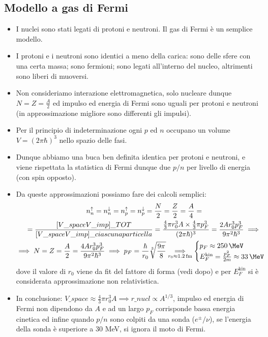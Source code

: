 \subsection{Modello a gas di Fermi}
\begin{itemize}
    \item I nuclei sono stati legati di protoni e neutroni. Il gas di Fermi è un semplice modello.
    \item I protoni e i neutroni sono identici a meno della carica: sono delle sfere con una certa massa; sono fermioni; sono legati all'interno del nucleo, altrimenti sono liberi di muoversi. 
    \item Non consideriamo interazione elettromagnetica, solo nucleare dunque $N=Z=\frac A2$ ed impulso ed energia di Fermi sono uguali per protoni e neutroni (in approssimazione migliore sono differenti gli impulsi). 
    \item Per il principio di indeterminazione ogni $p$ ed $n$ occupano un volume $V=(2\pi\hbar)^3$ nello spazio delle fasi.
    \item Dunque abbiamo una buca ben definita identica per protoni e neutroni, e viene rispettata la statistica di Fermi dunque due $p/n$ per livello di energia (con spin opposto).
    \item Da queste approssimazioni possiamo fare dei calcoli semplici:
    \begin{gather*}
    n_n^\uparrow=n_n^\downarrow=n_p^\uparrow=n_p^\downarrow=\frac N2=\frac Z2=\frac A4=\\
    =\frac{[V\_{space}V\_{imp}]\_{TOT}}{[V\_{space}V\_{imp}]\_{ciascuna particella}}=\frac{\frac43\pi r_0^3A\times\frac43\pi p_F^3}{(2\pi\hbar)^3}=\frac{2Ar_0^3p_F^3}{9\pi^2\hbar^3}\implies\\
    \implies N=Z=\frac A2=\frac{4Ar_0^3p_F^3}{9\pi^2\hbar^3}\implies p_F=\frac\hbar{r_0}\sqrt[3]{\frac{9\pi}8}\underset{r_0\approx1.2\,\text{fm}}{\implies}
    \begin{cases}
    p_F\approx250\,\MeV\\
    E_F^{\text{kin}}=\frac{p_F^2}{2m}\approx33\,\MeV
    \end{cases}
    \end{gather*}
    dove il valore di $r_0$ viene da fit del fattore di forma (vedi dopo) e per $E^{\text{kin}}_F$ si è considerata approssimazione non relativistica. 
    \item In conclusione: $V\_{space}\approx\frac43\pi r_0^3A\implies r\_{nucl}\propto A^{1/3}$, impulso ed energia di Fermi non dipendono da $A$ e ad un largo $p_F$ corrisponde bassa energia cinetica ed infine quando $p/n$ sono colpiti da una sonda ($e^\pm/\nu$), se l'energia della sonda è superiore a 30 MeV, si ignora il moto di Fermi.  
\end{itemize}
